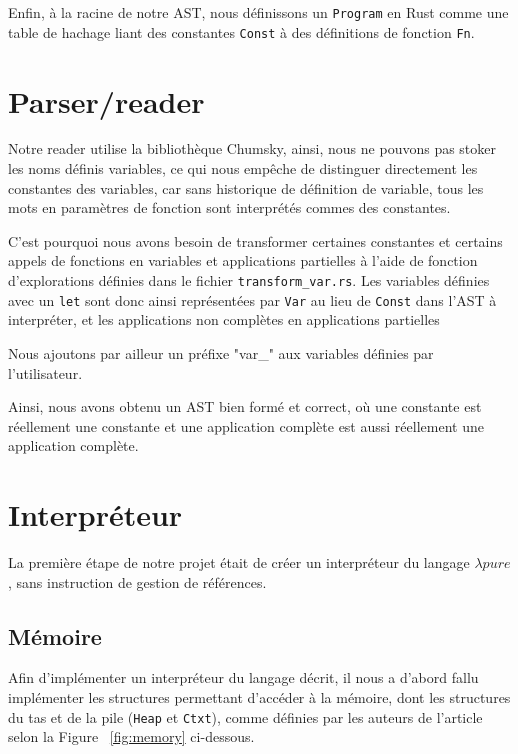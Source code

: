 \documentclass{rapportECL}
\begin{document}
\medskip

Enfin, à la racine de notre AST, nous définissons un \verb|Program| en Rust comme une table de hachage liant des constantes \verb|Const| à 
des définitions de fonction \verb|Fn|.

\bigskip

\section{Parser/reader}

Notre reader utilise la bibliothèque Chumsky\cite{zesterer_chumsky_nodate}, ainsi, nous ne pouvons pas stoker les noms définis 
variables, ce qui nous empêche de distinguer directement les constantes des variables, car sans historique de définition de variable, 
tous les mots en paramètres de fonction sont interprétés commes des constantes.

C'est pourquoi nous avons besoin de transformer certaines constantes et certains appels de fonctions en variables et applications partielles à l'aide de 
fonction d'explorations définies dans le fichier \verb|transform_var.rs|.
Les variables définies avec un \verb|let| sont donc ainsi représentées par \verb|Var| au lieu de \verb|Const| dans l'AST à interpréter,
et les applications non complètes en applications partielles

Nous ajoutons par ailleur un préfixe "var\_" aux variables définies par l'utilisateur.

Ainsi, nous avons obtenu un AST bien formé et correct, où une constante est réellement une constante et une application
complète est aussi réellement une application complète.

\section{Interpréteur}

La première étape de notre projet était de créer un interpréteur du langage $\lambda{pure}$, sans instruction de gestion de références.

\subsection{Mémoire}

Afin d'implémenter un interpréteur du langage décrit, il nous a d'abord fallu implémenter les structures permettant d'accéder à la mémoire, dont les structures du tas et de la pile (\verb|Heap| et \verb|Ctxt|), comme définies par les auteurs de l'article selon la Figure ~\ref{fig:memory} ci-dessous.
\end{document}
